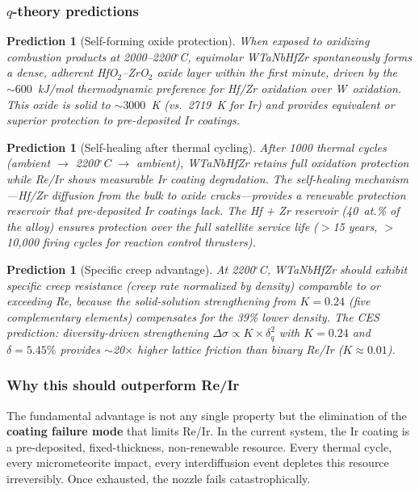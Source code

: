 \documentclass[12pt,letterpaper]{article}
\newtheorem{prediction}[theorem]{Prediction}
\theoremstyle{definition}
\begin{document}
\subsubsection{$q$-theory predictions}

\begin{prediction}[Self-forming oxide protection]\label{pred:nozzle_oxide}
When exposed to oxidizing combustion products at 2000--2200$^\circ$C, equimolar WTaNbHfZr spontaneously forms a dense, adherent HfO$_2$--ZrO$_2$ oxide layer within the first minute, driven by the ${\sim}600$~kJ/mol thermodynamic preference for Hf/Zr oxidation over W~oxidation.  This oxide is solid to ${\sim}3000$~K (vs.\ 2719~K for Ir) and provides equivalent or superior protection to pre-deposited Ir coatings.
\end{prediction}

\begin{prediction}[Self-healing after thermal cycling]\label{pred:nozzle_heal}
After 1000 thermal cycles (ambient $\to$ 2200$^\circ$C $\to$ ambient), WTaNbHfZr retains full oxidation protection while Re/Ir shows measurable Ir coating degradation.  The self-healing mechanism---Hf/Zr diffusion from the bulk to oxide cracks---provides a renewable protection reservoir that pre-deposited Ir coatings lack.  The Hf + Zr reservoir (40~at.\% of the alloy) ensures protection over the full satellite service life ($>$15 years, $>$10,000 firing cycles for reaction control thrusters).
\end{prediction}

\begin{prediction}[Specific creep advantage]\label{pred:nozzle_creep}
At 2200$^\circ$C, WTaNbHfZr should exhibit specific creep resistance (creep rate normalized by density) comparable to or exceeding Re, because the solid-solution strengthening from $K = 0.24$ (five complementary elements) compensates for the 39\% lower density.  The CES prediction: diversity-driven strengthening $\Delta\sigma \propto K \times \delta_q^2$ with $K = 0.24$ and $\delta = 5.45\%$ provides $\sim$20$\times$ higher lattice friction than binary Re/Ir ($K \approx 0.01$).
\end{prediction}

\subsubsection{Why this should outperform Re/Ir}

The fundamental advantage is not any single property but the elimination of the \textbf{coating failure mode} that limits Re/Ir.  In the current system, the Ir coating is a pre-deposited, fixed-thickness, non-renewable resource.  Every thermal cycle, every micrometeorite impact, every interdiffusion event depletes this resource irreversibly.  Once exhausted, the nozzle fails catastrophically.
\end{document}
